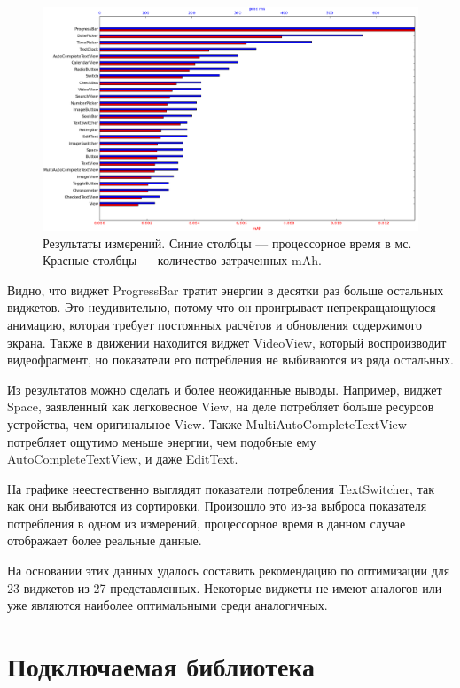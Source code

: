 \documentclass[a4paper,14pt]{extarticle} %
\begin{document}
	\begin{figure}[!htb]
		\includegraphics[width=\textwidth]{result_scaled}
		\caption{Результаты измерений. Синие столбцы --- процессорное время в мс. Красные столбцы --- количество затраченных mAh.}
		\label{fig:result_scaled}
	\end{figure}

	Видно, что виджет ProgressBar тратит энергии в десятки раз больше остальных виджетов. Это неудивительно, потому что он проигрывает непрекращающуюся анимацию, которая требует постоянных расчётов и обновления содержимого экрана. Также в движении находится виджет VideoView, который воспроизводит видеофрагмент, но показатели его потребления не выбиваются из ряда остальных.
	
	Из результатов можно сделать и более неожиданные выводы. Например, виджет Space, заявленный как легковесное View, на деле потребляет больше ресурсов устройства, чем оригинальное View. Также MultiAutoCompleteTextView потребляет ощутимо меньше энергии, чем подобные ему AutoCompleteTextView, и даже EditText.
	
	На графике неестественно выглядят показатели потребления TextSwitcher, так как они выбиваются из сортировки. Произошло это из-за выброса показателя потребления в одном из измерений, процессорное время в данном случае отображает более реальные данные.
	
	На основании этих данных удалось составить рекомендацию по оптимизации для 23 виджетов из 27 представленных. Некоторые виджеты не имеют аналогов или уже являются наиболее оптимальными среди аналогичных.
	
	\clearpage
	\section{Подключаемая библиотека}
	
\end{document}
